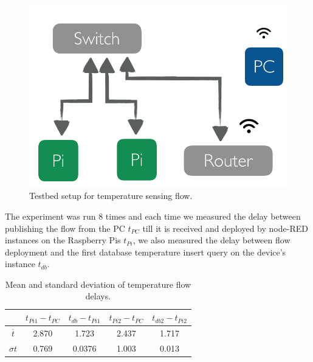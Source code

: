  \begin{figure}[H]
	\centering
	\includegraphics[scale=0.6]{images/tb-temp.png}
	\caption{Testbed setup for temperature sensing flow.}
	\label{fig:tb-temp}
\end{figure} 

\noindent The experiment was run 8 times and each time  we measured the delay between publishing the flow from the PC $ t_{PC}$ till it is received and deployed by  node-RED instances on the Raspberry Pis $t_{Pi}$, we also measured the delay between flow deployment and the first database temperature insert query on the device's instance $t_{db}$. 
\begin{table}[H]
	\centering
	\begin{tabular}{c|c|c|c|c}\toprule
		&  $ t_{Pi1} - t_{PC}$   & $t_{db} - t_{Pi1}$  & $ t_{Pi2} - t_{PC}$ &  $t_{db2} - t_{Pi2}$ \\ \midrule
$ \overline{t} $ &2.870&	1.723&	2.437&	1.717\\
$ \sigma t $& 0.769	&0.0376&	1.003&	0.013\\
	\end{tabular}
	\caption{Mean and standard deviation of temperature flow delays.}
	\label{table:temp}
\end{table}

